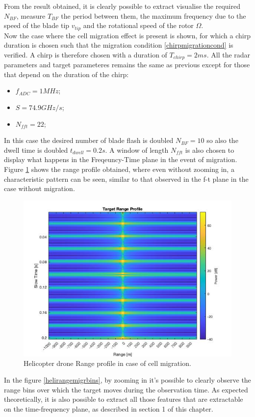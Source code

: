 From the result obtained, it is clearly possible to extract visualise the required $N_{BF}$, measure $T_{BF}$ the period between them, the maximum frequency due to the speed of the blade tip $v_{tip}$ and the rotational speed of the rotor $\Omega$.\\
Now the case where the cell migration effect is present is shown, for which a chirp duration is chosen such that the migration condition \ref{chirpmigrationcond} is verified. A chirp is therefore chosen with a duration of $T_{chirp} = 2 ms$. All the radar parameters and target parameteres remains the same as previous except for those that depend on the duration of the chirp:
\begin{itemize}

    \item $f_{ADC} = 1 MHz$;
    
    \item $S = 74.9 GHz/s$;
    
    \item $N_{fft} = 22 $;
    
\end{itemize}
In this case the desired number of blade flash is doubled $N_{BF} = 10$ so also the dwell time is doubled $t_{dwell} = 0.2 s$.
A window of length $N_{fft}$ is also chosen to display what happens in the Freqeuncy-Time plane in the event of migration. Figure \ref{helirangemigr} shows the range profile obtained, where even without zooming in, a characteristic pattern can be seen, similar to that observed in the f-t plane in the case without migration.

\begin{figure}[h!]
\centering
\includegraphics[width=12cm]{FMCW mD analysis-chap4/img/helic_range_migr_example.jpg}
\caption{Helicopter drone Range profile in case of cell migration.}
\label{helirangemigr}
\end{figure}
In the figure \ref{helirangemigrbins}, by zooming in it's possible to clearly observe the range bins over which the target moves during the observation time. As expected theoretically, it is also possible to extract all those features that are extractable on the time-frequency plane, as described in section 1 of this chapter.


